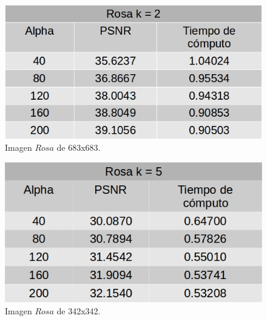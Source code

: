\documentclass[a4paper]{article}
\begin{document}
    \begin{figure}[H]
    \centering
    \includegraphics[scale=0.4]{imagenes/rosa2.jpg}
    \caption{Imagen $Rosa$ de 683x683.}
	\label{rosa2}
    \end{figure}
    
    \begin{figure}[H]
    \centering
    \includegraphics[scale=0.4]{imagenes/rosa5.jpg}
    \caption{Imagen $Rosa$ de 342x342.}
	\label{rosa3}
    \end{figure}    
    
\end{document}
